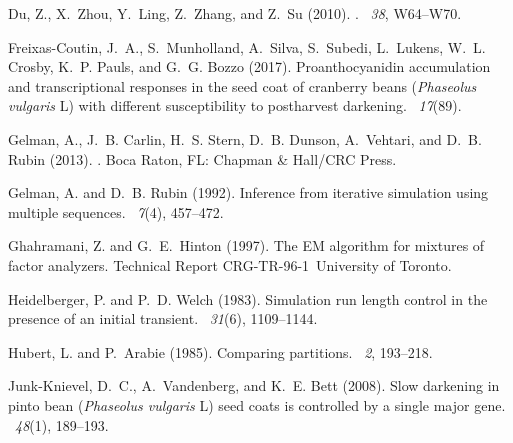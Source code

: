 \documentclass[12pt]{article}
\begin{document}
{\begin{thebibliography}{}
Du, Z., X.~Zhou, Y.~Ling, Z.~Zhang, and Z.~Su (2010).
.
~{\em 38}, W64--W70.
  
Freixas-Coutin, J.~A., S.~Munholland, A.~Silva, S.~Subedi, L.~Lukens, W.~L.
  Crosby, K.~P. Pauls, and G.~G. Bozzo (2017).
\newblock Proanthocyanidin accumulation and transcriptional responses in the
  seed coat of cranberry beans {(\textit{Phaseolus vulgaris} L)} with different
  susceptibility to postharvest darkening.
~{\em 17\/}(89).

Gelman, A., J.~B. Carlin, H.~S. Stern, D.~B. Dunson, A.~Vehtari, and D.~B.
  Rubin (2013).
.
\newblock Boca Raton, FL: Chapman \& Hall/CRC Press.

Gelman, A. and D.~B. Rubin (1992).
\newblock Inference from iterative simulation using multiple sequences.
~{\em 7\/}(4), 457--472.

Ghahramani, Z. and G.~E.~Hinton (1997).
\newblock The {EM} algorithm for mixtures of factor analyzers.
\newblock Technical Report  CRG-TR-96-1\ University of Toronto.

Heidelberger, P. and P.~D. Welch (1983).
\newblock Simulation run length control in the presence of an initial
  transient.
~{\em 31\/}(6), 1109--1144.

Hubert, L. and P.~Arabie (1985).
\newblock Comparing partitions.
~{\em 2}, 193--218.

Junk-Knievel, D.~C., A.~Vandenberg, and K.~E. Bett (2008).
\newblock Slow darkening in {pinto bean (\textit{Phaseolus vulgaris} L)} seed
  coats is controlled by a single major gene.
~{\em 48\/}(1), 189--193.


\end{thebibliography}}
\end{document}
